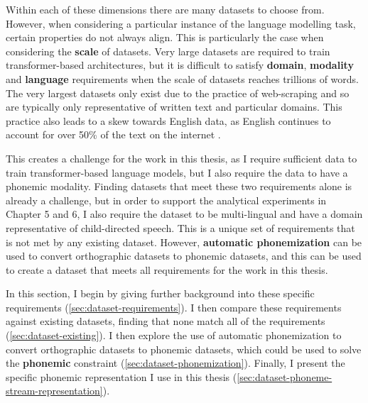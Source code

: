 Within each of these dimensions there are many datasets to choose from. However, when considering a particular instance of the language modelling task, certain properties do not always align. This is particularly the case when considering the \textbf{scale} of datasets. Very large datasets are required to train transformer-based architectures, but it is difficult to satisfy \textbf{domain}, \textbf{modality} and \textbf{language} requirements when the scale of datasets reaches trillions of words. The very largest datasets only exist due to the practice of web-scraping \citep{bansal-2022-datascaling} and so are typically only representative of written text and particular domains. This practice also leads to a skew towards English data, as English continues to account for over 50\% of the text on the internet \citep{ebbertz2002, danet2007multilingual, DataReportal2024}.

This creates a challenge for the work in this thesis, as I require sufficient data to train transformer-based language models, but I also require the data to have a phonemic modality. Finding datasets that meet these two requirements alone is already a challenge, but in order to support the analytical experiments in Chapter 5 and 6, I also require the dataset to be multi-lingual and have a domain representative of child-directed speech. This is a unique set of requirements that is not met by any existing dataset. However, \textbf{automatic phonemization} can be used to convert orthographic datasets to phonemic datasets, and this can be used to create a dataset that meets all requirements for the work in this thesis.

In this section, I begin by giving further background into these specific requirements (\cref{sec:dataset-requirements}). I then compare these requirements against existing datasets, finding that none match all of the requirements (\cref{sec:dataset-existing}). I then explore the use of automatic phonemization to convert orthographic datasets to phonemic datasets, which could be used to solve the \textbf{phonemic} constraint (\cref{sec:dataset-phonemization}). Finally, I present the specific phonemic representation I use in this thesis (\cref{sec:dataset-phoneme-stream-representation}).


